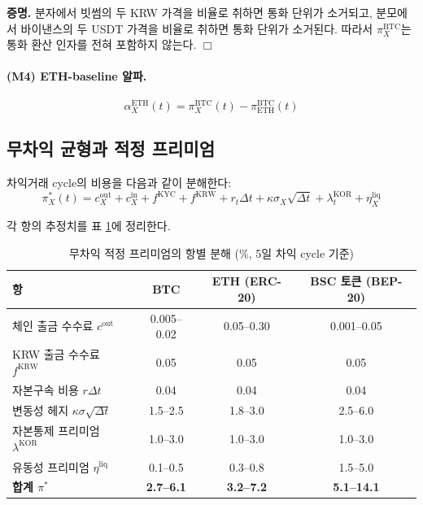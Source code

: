 \documentclass[11pt,a4paper]{article}
\begin{document}
\noindent\textbf{증명.} 분자에서 빗썸의 두 KRW 가격을 비율로 취하면 통화 단위가 소거되고,
분모에서 바이낸스의 두 USDT 가격을 비율로 취하면 통화 단위가 소거된다. 따라서 $\pi^{\text{BTC}}_X$는
통화 환산 인자를 전혀 포함하지 않는다. \hfill$\Box$

\paragraph{(M4) ETH-baseline 알파.}
\begin{equation}
\alpha_X^{\text{ETH}}(t) = \pi^{\text{BTC}}_X(t) - \pi^{\text{BTC}}_{\text{ETH}}(t)
\label{eq:alpha}
\end{equation}

\subsection{무차익 균형과 적정 프리미엄}

차익거래 cycle의 비용을 다음과 같이 분해한다:
\begin{equation}
\pi^*_X(t) = c_X^{\text{out}}+c_X^{\text{in}} + f^{\text{KYC}}+f^{\text{KRW}}
           + r_t\Delta t + \kappa\sigma_X\sqrt{\Delta t}
           + \lambda_t^{\text{KOR}} + \eta_X^{\text{liq}}
\label{eq:fair_premium}
\end{equation}

각 항의 추정치를 표 \ref{tab:fair_premium}에 정리한다.

\begin{table}[H]
\centering
\caption{무차익 적정 프리미엄의 항별 분해 (\%, 5일 차익 cycle 기준)}
\label{tab:fair_premium}
\begin{tabular}{lccc}
\toprule
항 & BTC & ETH (ERC-20) & BSC 토큰 (BEP-20) \\
\midrule
체인 출금 수수료 $c^{\text{out}}$ & 0.005--0.02 & 0.05--0.30 & 0.001--0.05 \\
KRW 출금 수수료 $f^{\text{KRW}}$  & 0.05 & 0.05 & 0.05 \\
자본구속 비용 $r\Delta t$         & 0.04 & 0.04 & 0.04 \\
변동성 헤지 $\kappa\sigma\sqrt{\Delta t}$ & 1.5--2.5 & 1.8--3.0 & 2.5--6.0 \\
자본통제 프리미엄 $\lambda^{\text{KOR}}$ & 1.0--3.0 & 1.0--3.0 & 1.0--3.0 \\
유동성 프리미엄 $\eta^{\text{liq}}$ & 0.1--0.5 & 0.3--0.8 & 1.5--5.0 \\
\midrule
\textbf{합계 $\pi^*$} & \textbf{2.7--6.1} & \textbf{3.2--7.2} & \textbf{5.1--14.1} \\
\bottomrule
\end{tabular}
\end{table}
\end{document}
